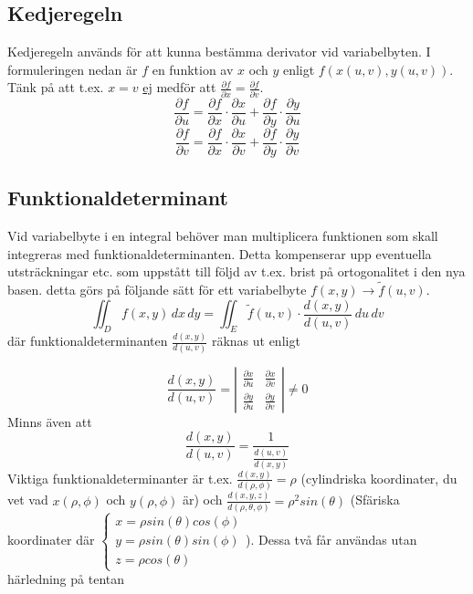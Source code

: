 \documentclass[10pt,a4paper]{article}
\begin{document}
\subsection{Kedjeregeln}
Kedjeregeln används för att kunna bestämma derivator vid variabelbyten. I formuleringen nedan är $f$ en funktion av $x$ och $y$ enligt $f(x(u,v),y(u,v))$. Tänk på att t.ex. $x=v$ \underline{ej} medför att $\frac{\partial f}{\partial x} = \frac{\partial f}{\partial v}$.
\begin{equation}
\frac{\partial f}{\partial u}=\frac{\partial f}{\partial x}\cdot \frac{\partial x}{\partial u} + \frac{\partial f}{\partial y} \cdot \frac{\partial y}{\partial u}
\end{equation}
\begin{equation}
\frac{\partial f}{\partial v}=\frac{\partial f}{\partial x}\cdot \frac{\partial x}{\partial v} + \frac{\partial f}{\partial y} \cdot \frac{\partial y}{\partial v}
\end{equation}

\subsection{Funktionaldeterminant}
Vid variabelbyte i en integral behöver man multiplicera funktionen som skall integreras med funktionaldeterminanten. Detta kompenserar upp eventuella utsträckningar etc. som uppstått till följd av t.ex. brist på ortogonalitet i den nya basen. detta görs på följande sätt för ett variabelbyte $f(x,y) \rightarrow \tilde{f}(u,v)$.
\begin{equation}
\iint_D f(x,y)\,dx\,dy = \iint_E \tilde{f}(u,v)\cdot \frac{d(x,y)}{d(u,v)}\,du\,dv
\end{equation}
där funktionaldeterminanten $\frac{d(x,y)}{d(u,v)}$ räknas ut enligt

\begin{equation}
\frac{d(x,y)}{d(u,v)} = \left| \begin{array}{ccc}\frac{\partial x}{\partial u} & \frac{\partial x}{\partial v} \\ \frac{\partial y}{\partial u} & \frac{\partial y}{\partial v} \end{array} \right| \neq 0
\end{equation}
Minns även att 
\begin{equation}
\frac{d(x,y)}{d(u,v)} = \frac{1}{\frac{d(u,v)}{d(x,y)}}
\end{equation}
Viktiga funktionaldeterminanter är t.ex. $\frac{d(x,y)}{d(\rho,\phi)} = \rho$ (cylindriska koordinater, du vet vad $x(\rho,\phi)$ och $y(\rho,\phi)$ är) och $\frac{d(x,y,z)}{d(\rho,\theta,\phi)} = \rho^2 sin(\theta)$ (Sfäriska koordinater där $\left\{ \begin{array}{lll}
x=\rho sin(\theta)cos(\phi)\\
y=\rho sin(\theta)sin(\phi)\\
z=\rho cos(\theta)
\end{array} \right. $). Dessa två får användas utan härledning på tentan
\end{document}
